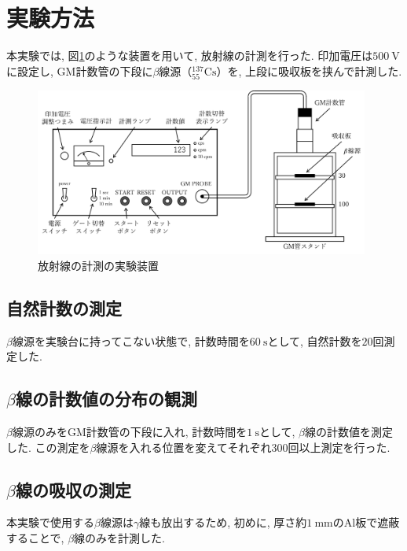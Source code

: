 \documentclass{jarticle}
\begin{document}
\section{実験方法}


本実験では, 図\ref{fg:radiation-method}のような装置を用いて, 放射線の計測を行った.
印加電圧は$500\ \mathrm{V}$に設定し, GM計数管の下段に$\beta$線源（$^{137}_{55}\mathrm{Cs}$）を, 上段に吸収板を挟んで計測した.

\begin{figure}[H]
  \begin{center}
    \includegraphics[width=110mm]{experimental_equipment.png}
    \caption{放射線の計測の実験装置}
    \label{fg:radiation-method}
  \end{center}
\end{figure}


\subsection{自然計数の測定}

$\beta$線源を実験台に持ってこない状態で, 計数時間を$60\ \mathrm{s}$として, 自然計数を$20$回測定した.


\subsection{$\beta$線の計数値の分布の観測}

$\beta$線源のみをGM計数管の下段に入れ, 計数時間を$1\ \mathrm{s}$として, $\beta$線の計数値を測定した.
この測定を$\beta$線源を入れる位置を変えてそれぞれ$300$回以上測定を行った.


\subsection{$\beta$線の吸収の測定}

本実験で使用する$\beta$線源は$\gamma$線も放出するため, 初めに, 厚さ約$1\ \mathrm{mm}$の$\mathrm{Al}$板で遮蔽することで, $\beta$線のみを計測した.
\end{document}
